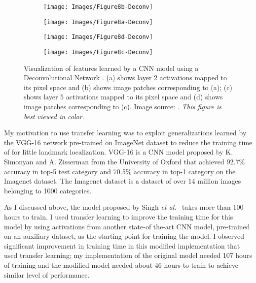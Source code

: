 \documentclass [11pt,letterpaper ,twoside ,openany ]{report}
\begin{document}
    \begin{figure}[t]
    \centering
        \begin{subfigure}[b]{0.23\linewidth}
            \centering
            \texttt{[image: Images/Figure8b-Deconv]}
            \caption{}
        \end{subfigure}    
        \begin{subfigure}[b]{0.23\linewidth}
            \centering
            \texttt{[image: Images/Figure8a-Deconv]}
            \caption{}
        \end{subfigure}
        \begin{subfigure}[b]{0.23\linewidth}
            \centering
            \texttt{[image: Images/Figure8d-Deconv]}
            \caption{}
        \end{subfigure}                
        \begin{subfigure}[b]{0.23\linewidth}
            \centering
            \texttt{[image: Images/Figure8c-Deconv]}
            \caption{}
        \end{subfigure}
        \caption{Visualization of features learned by a CNN model using a Deconvolutional Network \cite{zeiler2014visualizing}. (a) shows layer 2 activations mapped to its pixel space and (b) shows image patches corresponding to (a); (c) shows layer 5 activations mapped to its pixel space and (d) shows image patches corresponding to (c). Image source: \cite{zeiler2014visualizing}. \textit{This figure is best viewed in color.}}
        \label{fig:devonv}
    \end{figure}

    My motivation to use transfer learning was to exploit generalizations learned by the VGG-16 network \cite{simonyan2014very} pre-trained on ImageNet \cite{russakovsky2015imagenet} dataset to reduce the training time of for little landmark localization. VGG-16 \cite{simonyan2014very} is a CNN model proposed by K. Simonyan and A. Zisserman from the University of Oxford that achieved 92.7\% accuracy in top-5 test category and 70.5\% accuracy in top-1 category on the Imagenet dataset. The Imagenet dataset \cite{russakovsky2015imagenet} is a dataset of over 14 million images belonging to 1000 categories.

    As I discussed above, the model proposed by Singh \textit{et al}.\ \cite{Singh_2016_CVPR} takes more than 100 hours to train. I used transfer learning to improve the training time for this model by using activations from another state-of the-art CNN model, pre-trained on an auxiliary dataset, as the starting point for training the model. I observed significant improvement in training time in this modified implementation that used transfer learning; my implementation of the original model needed 107 hours of training and the modified model needed about 46 hours to train to achieve similar level of performance.
\end{document}
